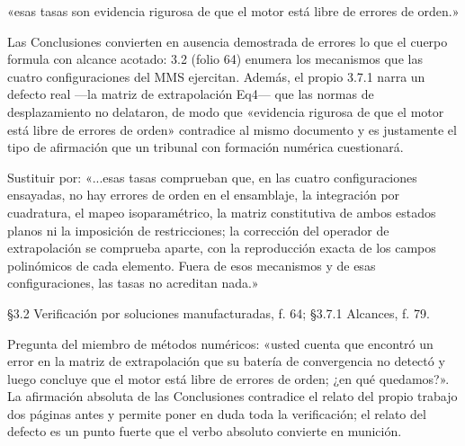 \begin{dice}«esas tasas son evidencia rigurosa de que el motor está libre de errores de orden.»\end{dice}
{\small{}Las Conclusiones convierten en ausencia demostrada de errores lo que el cuerpo formula con alcance acotado: 3.2 (folio 64) enumera los mecanismos que las cuatro configuraciones del MMS ejercitan. Además, el propio 3.7.1 narra un defecto real —la matriz de extrapolación Eq4— que las normas de desplazamiento no delataron, de modo que «evidencia rigurosa de que el motor está libre de errores de orden» contradice al mismo documento y es justamente el tipo de afirmación que un tribunal con formación numérica cuestionará.\par}
\begin{debedecir}Sustituir por: «...esas tasas comprueban que, en las cuatro configuraciones ensayadas, no hay errores de orden en el ensamblaje, la integración por cuadratura, el mapeo isoparamétrico, la matriz constitutiva de ambos estados planos ni la imposición de restricciones; la corrección del operador de extrapolación se comprueba aparte, con la reproducción exacta de los campos polinómicos de cada elemento. Fuera de esos mecanismos y de esas configuraciones, las tasas no acreditan nada.»\end{debedecir}
{\small{}§3.2 Verificación por soluciones manufacturadas, f. 64; §3.7.1 Alcances, f. 79.\par}
{\small\color{gris}Pregunta del miembro de métodos numéricos: «usted cuenta que encontró un error en la matriz de extrapolación que su batería de convergencia no detectó y luego concluye que el motor está libre de errores de orden; ¿en qué quedamos?». La afirmación absoluta de las Conclusiones contradice el relato del propio trabajo dos páginas antes y permite poner en duda toda la verificación; el relato del defecto es un punto fuerte que el verbo absoluto convierte en munición.\par}
\vspace{6pt}

